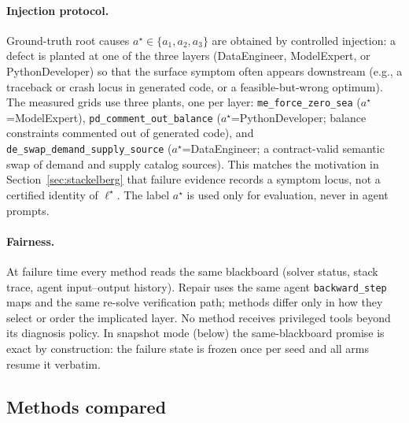 \documentclass[a4paper,fleqn]{cas-sc}
\begin{document}
\paragraph{Injection protocol.}
Ground-truth root causes $a^{\star}\in\{a_1,a_2,a_3\}$ are obtained by
controlled injection: a defect is planted at one of the three layers
(DataEngineer, ModelExpert, or PythonDeveloper) so that the surface
symptom often appears downstream (e.g., a traceback or crash locus in
generated code, or a feasible-but-wrong optimum). The measured grids use
three plants, one per layer: \texttt{me\_force\_zero\_sea}
($a^{\star}$=ModelExpert), \texttt{pd\_comment\_out\_balance}
($a^{\star}$=PythonDeveloper; balance constraints commented out of
generated code), and \texttt{de\_swap\_demand\_supply\_source}
($a^{\star}$=DataEngineer; a contract-valid semantic swap of demand and
supply catalog sources). This matches the motivation in
Section~\ref{sec:stackelberg} that failure evidence records a symptom locus,
not a certified identity of $\ell^{\star}$. The label $a^{\star}$ is used only
for evaluation, never in agent prompts.

\paragraph{Fairness.}
At failure time every method reads the same blackboard (solver status, stack
trace, agent input--output history). Repair uses the same agent
\texttt{backward\_step} maps and the same re-solve verification path;
methods differ only in how they select or order the implicated layer. No
method receives privileged tools beyond its diagnosis policy. In snapshot
mode (below) the same-blackboard promise is exact by construction: the
failure state is frozen once per seed and all arms resume it verbatim.

\subsection{Methods compared}
\label{sec:exp_methods}
\end{document}
